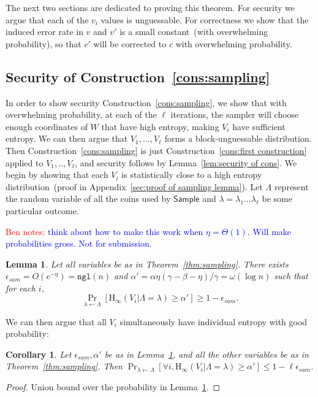 \documentclass[11pt]{article}
\newcommand{\apref}[1]{\mbox{Appendix~\ref{#1}}}
\newcommand{\thref}[1]{\mbox{Theorem~\ref{#1}}}
\newcommand{\lemref}[1]{\mbox{Lemma~\ref{#1}}}
\newcommand{\consref}[1]{\mbox{Construction~\ref{#1}}}
\newcommand{\class}[1]{{\ensuremath{\mathsf{#1}}}}
\newcommand{\sample}{\ensuremath{\class{Sample}}\xspace}
\newcommand{\ngl}{\ensuremath{\mathtt{ngl}}\xspace}
\newcommand{\Hoo}{\mathrm{H}_\infty}
\newtheorem{lemma}[theorem]{Lemma}
\newtheorem{corollary}[theorem]{Corollary}
\newcommand{\authnote}[2]{{\textcolor{red}{\textsf{#1 notes: }\textcolor{blue}{ #2}}\marginpar{\textcolor{red}{\textbf{!!!!!}}}}}
\newcommand{\authnote}[2]{}
\newcommand{\bnote}[1]{{\authnote{Ben}{#1}}}
\begin{document}
The next two sections are dedicated to proving this theorem.
 For security we argue that each of the $v_i$ values is unguessable.  For correctness we show that the induced error rate in $v$ and $v'$ is a small constant~(with overwhelming probability), so that $c'$ will be corrected to $c$ with overwhelming probability.

\subsection{Security of \consref{cons:sampling}}
In order to show security \consref{cons:sampling}, we
show that with overwhelming probability, at each of the $\ell$ iterations, the sampler will choose enough coordinates of $W$ that have high entropy, making $V_i$ have sufficient entropy.   We can then argue that $V_1,..., V_\ell$ forms a block-unguessable distribution.  Then \consref{cons:sampling} is just \consref{cons:first construction} applied to $V_1,.., V_\ell$, and security follows by \lemref{lem:security of cons}.  We begin by showing that each $V_i$ is statistically close to a high entropy distribution~(proof in \apref{sec:proof of sampling lemma}).   Let $\Lambda$ represent the random variable of all the coins used by $\sample$ and $\lambda=\lambda_1 \dots \lambda_\ell$
be some particular outcome.

\bnote{think about how to make this work when $\eta = \Theta(1)$.  Will make probabilities gross.  Not for submission.}
\begin{lemma}
\label{lem:sampling works}
Let all variables be as in \thref{thm:sampling}.
There exists $\epsilon_{sam} = O(e^{-\eta}) = \ngl(n)$ and $\alpha' = \alpha\eta(\gamma-\beta-\eta)/\gamma = \omega(\log n)$ such that for each $i$,
\[
\Pr_{\lambda\leftarrow \Lambda}[\Hoo(V_i | \Lambda= \lambda) \geq \alpha'] \geq 1- \epsilon_{sam}.
\]
\end{lemma}

\noindent
We can then argue that all $V_i$ simultaneously have individual entropy with good probability:
\begin{corollary}
\label{cor:samp sec}
 Let $\epsilon_{sam}, \alpha'$ be as in \lemref{lem:sampling works}, and all the other variables be as in \thref{thm:sampling}.  Then $\Pr_{\lambda\leftarrow \Lambda}[\forall i, \Hoo(V_i | \Lambda = \lambda)  \ge \alpha'] \leq 1-\ell\epsilon_{sam}$.
\end{corollary}
\begin{proof}
Union bound over the probability in \lemref{lem:sampling works}.
\end{proof}
\end{document}

